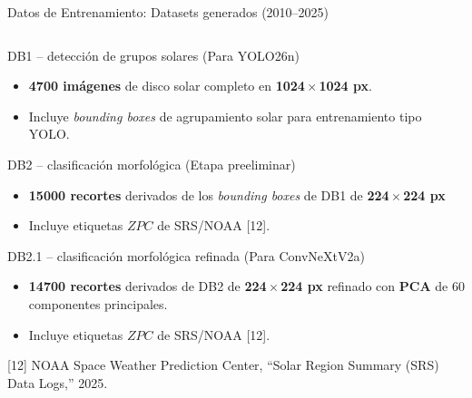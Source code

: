 \documentclass[aspectratio=169]{beamer}
\begin{document}
\begin{frame}{Datos de Entrenamiento: Datasets generados (2010--2025)}
    \vspace{-0.4cm} %
    
    \begin{columns}[t]
        \begin{column}{\textwidth}
            \hfill
            \setlength{\fboxrule}{1.2pt} %
            \setlength{\fboxsep}{4pt}    %
        \end{column}
    \end{columns}
    \footnotesize
    \begin{block}{DB1 -- detección de grupos solares (Para YOLO26n)}
      \begin{itemize}
            \item \textbf{4700 im\'agenes} de disco solar completo en \textbf{1024\,$\times$\,1024 px}.
            \item Incluye \textit{bounding boxes} de agrupamiento solar para entrenamiento tipo YOLO.
      \end{itemize}
    \end{block}

    \begin{block}{DB2 -- clasificación morfológica (Etapa preeliminar)}
        \begin{itemize}
            \item \textbf{15000 recortes} derivados de los \textit{bounding boxes} de DB1 de \textbf{224\,$\times$\,224 px}
            \item Incluye etiquetas $ZPC$ de SRS/NOAA [12].
        \end{itemize}
    \end{block}

    \begin{block}{DB2.1 -- clasificación morfológica refinada (Para ConvNeXtV2a)}
        \begin{itemize}
            \item \textbf{14700 recortes} derivados de DB2 de \textbf{224\,$\times$\,224 px} refinado con \textbf{PCA} de 60 componentes principales.
            \item Incluye etiquetas $ZPC$ de SRS/NOAA [12].
        \end{itemize}
    \end{block}
    
    \vfill
    {\tiny\color{gray} [12] NOAA Space Weather Prediction Center, “Solar Region Summary (SRS) Data Logs,” 2025.}
\end{frame}
\end{document}
